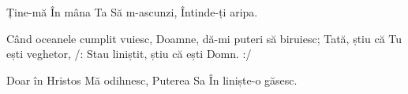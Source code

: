 \beginverse
Ține-mă
În mâna Ta
Să m-ascunzi,
Întinde-ți aripa.
\endverse

\beginchorus
Când oceanele cumplit vuiesc,
Doamne, dă-mi puteri să biruiesc;
Tată, știu că Tu ești veghetor,
/: Stau liniștit, știu că ești Domn. :/
\endchorus

\beginverse
Doar în Hristos
Mă odihnesc,
Puterea Sa
În liniște-o găsesc.
\endverse
\endsong